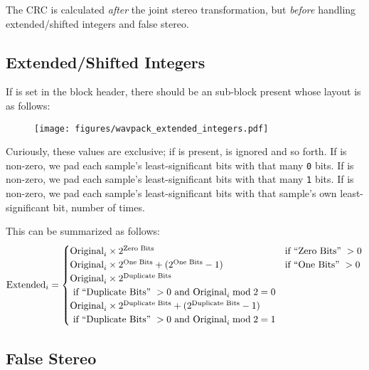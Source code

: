 The CRC is calculated \textit{after} the joint stereo transformation,
but \textit{before} handling extended/shifted integers and false stereo.

\clearpage

\subsection{Extended/Shifted Integers}
\label{wavpack_extended_integers}

If  is set in the block header,
there should be an  sub-block present whose layout
is as follows:

\begin{figure}[h]
\texttt{[image: figures/wavpack\_extended\_integers.pdf]}
\end{figure}

Curiously, these values are exclusive; if  is present,
 is ignored and so forth.
If  is non-zero, we pad each sample's least-significant
bits with that many \texttt{0} bits.
If  is non-zero, we pad each sample's least-significant
bits with that many \texttt{1} bits.
If  is non-zero, we pad each sample's least-significant
bits with that sample's own least-significant bit,
 number of times.

This can be summarized as follows:
\begin{equation*}
\text{Extended}_i =
\begin{cases}
\text{Original}_i \times 2 ^ {\text{Zero Bits}} & \text{if ``{Zero Bits}'' } > 0 \\
\text{Original}_i \times 2 ^ {\text{One Bits}} + (2 ^ {\text{One Bits}} - 1) & \text{if ``{One Bits}'' } > 0 \\
\text{Original}_i \times 2 ^ {\text{Duplicate Bits}} \\
\text{ if ``{Duplicate Bits}'' } > 0 \text{ and }\text{Original}_i \bmod{2} = 0 \\
\text{Original}_i \times 2 ^ {\text{Duplicate Bits}} + (2 ^ {\text{Duplicate Bits}} - 1) \\
\text{ if ``{Duplicate Bits}'' } > 0 \text{ and }\text{Original}_i \bmod{2} = 1
\end{cases}
\end{equation*}

\subsection{False Stereo}

